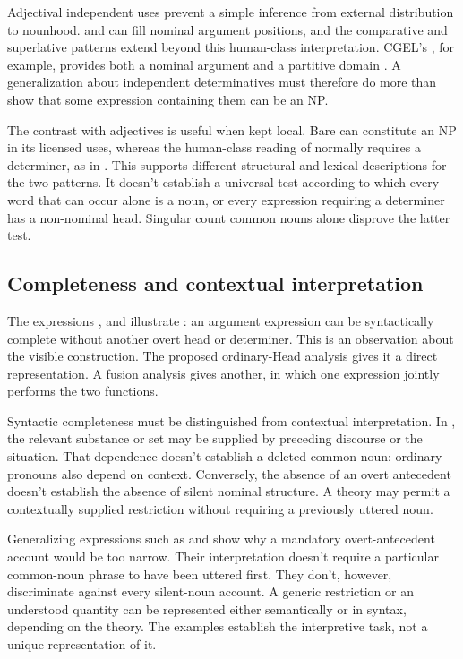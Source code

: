 \documentclass[12pt]{article}
\begin{document}
Adjectival independent uses prevent a simple inference from external distribution to nounhood.  and  can fill nominal argument positions, and the comparative and superlative patterns extend beyond this human-class interpretation. CGEL's , for example, provides both a nominal argument and a partitive domain \citep[332--333, 416--423]{huddleston2002}. A generalization about independent determinatives must therefore do more than show that some expression containing them can be an NP.

The contrast with adjectives is useful when kept local. Bare  can constitute an NP in its licensed uses, whereas the human-class reading of  normally requires a determiner, as in . This supports different structural and lexical descriptions for the two patterns. It doesn't establish a universal test according to which every word that can occur alone is a noun, or every expression requiring a determiner has a non-nominal head. Singular count common nouns alone disprove the latter test.

\subsection{Completeness and contextual interpretation}

The expressions ,  and  illustrate : an argument expression can be syntactically complete without another overt head or determiner. This is an observation about the visible construction. The proposed ordinary-Head analysis gives it a direct representation. A fusion analysis gives another, in which one expression jointly performs the two functions.

Syntactic completeness must be distinguished from contextual interpretation. In , the relevant substance or set may be supplied by preceding discourse or the situation. That dependence doesn't establish a deleted common noun: ordinary pronouns also depend on context. Conversely, the absence of an overt antecedent doesn't establish the absence of silent nominal structure. A theory may permit a contextually supplied restriction without requiring a previously uttered noun.

Generalizing expressions such as  and  show why a mandatory overt-antecedent account would be too narrow. Their interpretation doesn't require a particular common-noun phrase to have been uttered first. They don't, however, discriminate against every silent-noun account. A generic restriction or an understood quantity can be represented either semantically or in syntax, depending on the theory. The examples establish the interpretive task, not a unique representation of it.
\end{document}
